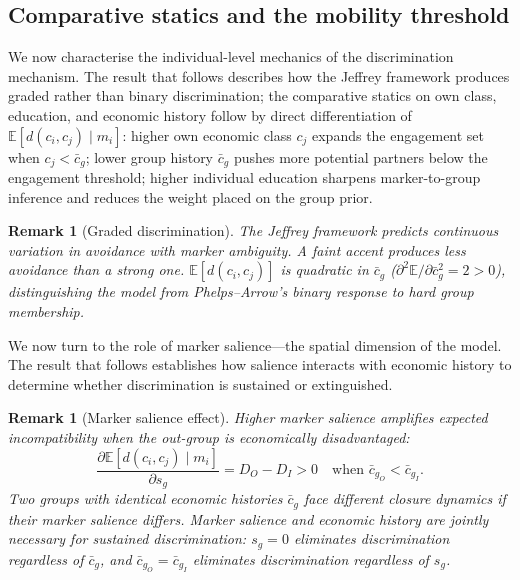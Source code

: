 \documentclass[pdflatex,sn-basic]{sn-jnl}
\newcommand{\E}{\mathbb{E}}
\theoremstyle{thmstyleone}
\newtheorem{remark}[proposition]{Remark}
\numberwithin{proposition}{subsection}
\begin{document}
\subsection{Comparative statics and the mobility threshold}
\label{subsec:intergenerational}

We now characterise the individual-level mechanics of the
discrimination mechanism. The result that follows describes how the Jeffrey framework
produces graded rather than binary discrimination; the comparative
statics on own class, education, and economic history follow by
direct differentiation of $\E[d(c_i, c_j) \mid m_i]$: higher own
economic class $c_j$ expands the engagement set when $c_j <
\bar{c}_g$; lower group history $\bar{c}_g$ pushes more potential
partners below the engagement threshold; higher individual education
sharpens marker-to-group inference and reduces the weight placed on
the group prior.

\begin{remark}[Graded discrimination]
\label{rem:graded}
The Jeffrey framework predicts continuous variation in avoidance with
marker ambiguity. A faint accent produces less avoidance than a
strong one. $\E[d(c_i, c_j)]$ is quadratic in $\bar{c}_g$
($\partial^2 \E/\partial \bar{c}_g^2 = 2 > 0$), distinguishing the model
from Phelps--Arrow's binary response to hard group membership.
\end{remark}

We now turn to the role of marker salience---the spatial dimension
of the model. The result that follows establishes how salience
interacts with economic history to determine whether discrimination
is sustained or extinguished.

\begin{remark}[Marker salience effect]
\label{rem:salience}
Higher marker salience amplifies expected incompatibility when the
out-group is economically disadvantaged:
\[
  \frac{\partial \E[d(c_i, c_j) \mid m_i]}{\partial s_g}
  = D_O - D_I > 0
  \quad \text{when } \bar{c}_{g_O} < \bar{c}_{g_I}.
\]
Two groups with identical economic histories $\bar{c}_g$ face
different closure dynamics if their marker salience differs. Marker
salience and economic history are jointly necessary for sustained
discrimination: $s_g = 0$ eliminates discrimination regardless of
$\bar{c}_g$, and $\bar{c}_{g_O} = \bar{c}_{g_I}$ eliminates
discrimination regardless of $s_g$.
\end{remark}
\end{document}
